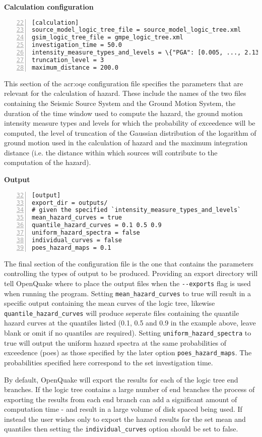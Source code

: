 \textbf{Calculation configuration}
\label{sec:calculation_configuration}

\begin{Verbatim}[frame=single, commandchars=\\\{\}, fontsize=\small,
     firstnumber=22, numbers=left, numbersep=2pt]
[calculation]
source_model_logic_tree_file = source_model_logic_tree.xml
gsim_logic_tree_file = gmpe_logic_tree.xml
investigation_time = 50.0
intensity_measure_types_and_levels = \{"PGA": [0.005, ..., 2.13]\}
truncation_level = 3
maximum_distance = 200.0
\end{Verbatim}

This section of the \gls{acr:oqe} configuration file specifies the parameters
that are relevant for the calculation of hazard. These include the names of
the two files containing the Seismic Source System and the Ground  Motion
System, the duration of the time window used to compute the  hazard, the
ground motion intensity measure types and levels for  which the probability of
exceedence will be computed, the level of truncation of the Gaussian
distribution of the logarithm of ground motion used in the calculation of
hazard and the maximum integration distance (i.e. the distance within which
sources will contribute to the computation of the hazard).


\textbf{Output}

\begin{Verbatim}[frame=single, commandchars=\\\{\}, fontsize=\small,
    firstnumber=32, numbers=left, numbersep=2pt]
[output]
export_dir = outputs/
# given the specified `intensity_measure_types_and_levels`
mean_hazard_curves = true
quantile_hazard_curves = 0.1 0.5 0.9
uniform_hazard_spectra = false
individual_curves = false
poes_hazard_maps = 0.1
\end{Verbatim}

The final section of the configuration file is the one that contains the
parameters controlling the types of output to be produced. Providing an export directory will tell OpenQuake where to place the output files when the \texttt{-{}-exports} flag is used when running the program. Setting \verb=mean_hazard_curves= to true will result in a specific output containing the mean curves of the logic tree, likewise \verb=quantile_hazard_curves= will produce seperate files containing the quantile hazard curves at the quantiles listed (0.1, 0.5 and 0.9 in the example above, leave blank or omit if no quantiles are required). Setting \verb=uniform_hazard_spectra= to true will output the uniform hazard spectra at the same probabilities of exceedence (poes) as those specified by the later option \verb=poes_hazard_maps=. The probabilities specified here correspond to the set investigation time. 

By default, OpenQuake will export the results for each of the logic tree end branches. If the logic tree contains a large number of end branches the process of exporting the results from each end branch can add a significant amount of computation time - and result in a large volume of disk spaced being used. If instead the user wishes only to export the hazard results for the set mean and quantiles then setting the \verb=individual_curves= option should be set to false. 
